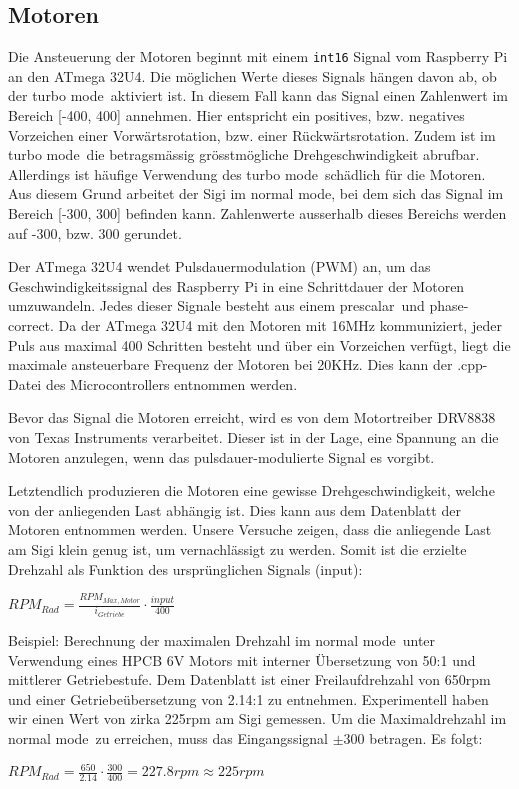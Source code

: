 \documentclass[a4paper, 12pt]{article}
\begin{document}
\subsection*{Motoren}
Die Ansteuerung der Motoren beginnt mit einem \verb|int16| Signal vom Raspberry Pi an den ATmega 32U4. Die möglichen Werte dieses Signals hängen davon ab, ob der \glqq turbo mode\grqq~aktiviert ist. In diesem Fall kann das Signal einen Zahlenwert im Bereich [-400, 400] annehmen. Hier entspricht ein positives, bzw. negatives Vorzeichen einer Vorwärtsrotation, bzw. einer Rückwärtsrotation. Zudem ist im \glqq turbo mode\grqq~die betragsmässig grösstmögliche Drehgeschwindigkeit abrufbar. Allerdings ist häufige Verwendung des \glqq turbo mode\grqq~schädlich für die Motoren. Aus diesem Grund arbeitet der Sigi im \glqq normal mode\grqq, bei dem sich das Signal im Bereich [-300, 300] befinden kann. Zahlenwerte ausserhalb dieses Bereichs werden auf -300, bzw. 300 gerundet. \par
Der ATmega 32U4 wendet Pulsdauermodulation (PWM) an, um das Geschwindigkeitssignal des Raspberry Pi in eine Schrittdauer der Motoren umzuwandeln. Jedes dieser Signale besteht aus einem \glqq prescalar\grqq~und \glqq phase-correct\grqq. Da der ATmega 32U4 mit den Motoren mit 16MHz kommuniziert, jeder Puls aus maximal 400 Schritten besteht und über ein Vorzeichen verfügt, liegt die maximale ansteuerbare Frequenz der Motoren bei 20KHz. Dies kann der .cpp-Datei des Microcontrollers entnommen werden. \par
Bevor das Signal die Motoren erreicht, wird es von dem Motortreiber DRV8838 von Texas Instruments verarbeitet. Dieser ist in der Lage, eine Spannung an die Motoren anzulegen, wenn das pulsdauer-modulierte Signal es vorgibt. \par
Letztendlich produzieren die Motoren eine gewisse Drehgeschwindigkeit, welche von der anliegenden Last abhängig ist. Dies kann aus dem Datenblatt der Motoren entnommen werden. Unsere Versuche zeigen, dass die anliegende Last am Sigi klein genug ist, um vernachlässigt zu werden. Somit ist die erzielte Drehzahl als Funktion des ursprünglichen Signals (\glqq input\grqq): \par
$RPM_{Rad} = \frac{RPM_{Max,Motor}}{i_{Getriebe}} \cdot \frac{input}{400}$ \par
Beispiel: Berechnung der maximalen Drehzahl im \glqq normal mode\grqq~unter Verwendung eines HPCB 6V Motors mit interner Übersetzung von 50:1 und mittlerer Getriebestufe. Dem Datenblatt ist einer Freilaufdrehzahl von 650rpm und einer Getriebeübersetzung von 2.14:1 zu entnehmen. Experimentell haben wir einen Wert von zirka 225rpm am Sigi gemessen. Um die Maximaldrehzahl im \glqq normal mode\grqq~zu erreichen, muss das Eingangssignal $\pm 300$ betragen. Es folgt: \par
$RPM_{Rad} = \frac{650}{2.14} \cdot \frac{300}{400} = 227.8rpm \approx 225rpm$
\end{document}
